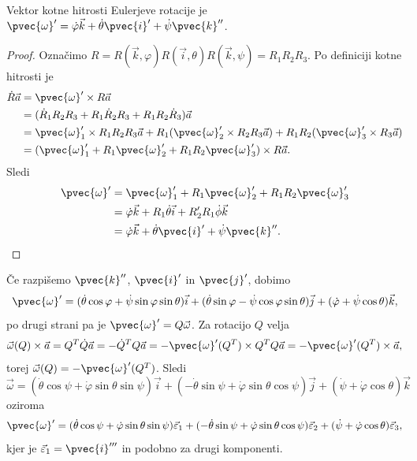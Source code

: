
\begin{trditev}
  Vektor kotne hitrosti Eulerjeve rotacije je $\pvec{\omega}' = \dot{\varphi}
  \vec{k} + \dot{\theta} \pvec{i}' + \dot{\psi} \pvec{k}''$.
\end{trditev}

\begin{proof}
  Označimo $R = R(\vec{k}, \varphi) R(\vec{i}, \theta) R(\vec{k}, \psi) = R_1
  R_2 R_3$.
  Po definiciji kotne hitrosti je
  \begin{align*}
	\dot{R} \vec{a}
	&= \pvec{\omega}' \times R \vec{a} \\
	&= (\dot{R}_1 R_2 R_3 + R_1 \dot{R}_2 R_3 + R_1 R_2 \dot{R}_3) \vec{a} \\
	&= \pvec{\omega}_1' \times R_1 R_2 R_3 \vec{a}
	  + R_1 (\pvec{\omega}_2' \times R_2 R_3 \vec{a})
	  + R_1 R_2 (\pvec{\omega}_3' \times R_3 \vec{a}) \\
	&= (\pvec{\omega}_1' + R_1 \pvec{\omega}_2' + R_1 R_2 \pvec{\omega}_3')
	  \times R \vec{a}.
  \end{align*}
  Sledi
  \begin{align*}
	\pvec{\omega}'
	&= \pvec{\omega}_1' + R_1 \pvec{\omega}_2' + R_1 R_2 \pvec{\omega}_3' \\
	&= \dot{\varphi} \vec{k} + R_1 \dot{\theta} \vec{i} + R_2' R_1 \dot{\phi} \vec{k} \\
	&= \dot{\varphi} \vec{k} + \dot{\theta} \pvec{i}' + \dot{\psi} \pvec{k}''.
  \end{align*}
\end{proof}


Če razpišemo $\pvec{k}''$, $\pvec{i}'$ in $\pvec{j}'$, dobimo
\[
  \pvec{\omega}'
  = (\dot{\theta} \cos \varphi + \dot{\psi} \sin \varphi \sin \theta) \vec{i}
  + (\dot{\theta} \sin \varphi - \dot{\psi} \cos \varphi \sin \theta) \vec{j}
  + (\dot{\varphi} + \dot{\psi} \cos \theta) \vec{k},
\]
po drugi strani pa je $\pvec{\omega}' = Q \vec{\omega}$.
Za rotacijo $Q$ velja
\[
  \vec{\omega}(Q) \times \vec{a} = Q^T \dot{Q} \vec{a} = - \dot{Q}^T Q \vec{a}
  = - \pvec{\omega}'(Q^T) \times Q^T Q \vec{a} = - \pvec{\omega}'(Q^T) \times \vec{a},
\]
torej $\vec{\omega}(Q) = - \pvec{\omega}'(Q^T)$.
Sledi
\[
  \vec{\omega}
  = (\dot{\theta} \cos \psi + \dot{\varphi} \sin \theta \sin \psi) \vec{i}
  + (- \dot{\theta} \sin \psi + \dot{\varphi} \sin \theta \cos \psi) \vec{j}
  + (\dot{\psi} + \dot{\varphi} \cos \theta) \vec{k}
\]
oziroma
\[
  \pvec{\omega}'
  = (\dot{\theta} \cos \psi + \dot{\varphi} \sin \theta \sin \psi) \vec{\varepsilon}_1
  + (- \dot{\theta} \sin \psi + \dot{\varphi} \sin \theta \cos \psi) \vec{\varepsilon}_2
  + (\dot{\psi} + \dot{\varphi} \cos \theta) \vec{\varepsilon}_3,
\]
kjer je $\vec{\varepsilon}_1 = \pvec{i}'''$ in podobno za drugi komponenti.


